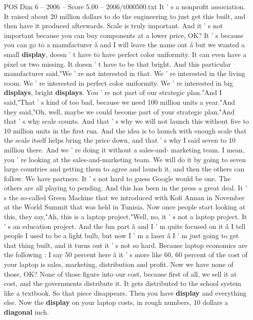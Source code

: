 \begin{textsample}{POS Dim 6 – 2006 – Score 5.00 – 2006/t000500.txt}
It ' s a nonprofit association.
It raised about 20 million dollars to do the engineering to just get this built, and then have it produced afterwards.
Scale is truly important.
And it ' s not important because you can buy components at a lower price, OK?
It ' s because you can go to a manufacturer â and I will leave the name out â but we wanted a small \textbf{display}, doesn ' t have to have perfect color uniformity.
It can even have a pixel or two missing.
It doesn ' t have to be that bright.
And this particular manufacturer said,"We ' re not interested in that.
We ' re interested in the living room.
We ' re interested in perfect color uniformity.
We ' re interested in big \textbf{displays}, bright \textbf{displays}.
You ' re not part of our strategic plan."And I said,"That ' s kind of too bad, because we need 100 million units a year."And they said,"Oh, well, maybe we could become part of your strategic plan."And that ' s why scale counts.
And that ' s why we will not launch this without five to 10 million units in the first run.
And the idea is to launch with enough scale that the scale itself helps bring the price down, and that ' s why I said seven to 10 million there.
And we ' re doing it without a sales-and- marketing team.
I mean, you ' re looking at the sales-and-marketing team.
We will do it by going to seven large countries and getting them to agree and launch it, and then the others can follow.
We have partners.
It ' s not hard to guess Google would be one.
The others are all playing to pending.
And this has been in the press a great deal.
It ' s the so-called Green Machine that we introduced with Kofi Annan in November at the World Summit that was held in Tunisia.
Now once people start looking at this, they say,"Ah, this is a laptop project."Well, no, it ' s not a laptop project.
It ' s an education project.
And the fun part â and I ' m quite focused on it â I tell people I used to be a light bulb, but now I ' m a laser â I ' m just going to get that thing built, and it turns out it ' s not so hard.
Because laptop economics are the following : I say 50 percent here â it ' s more like 60, 60 percent of the cost of your laptop is sales, marketing, distribution and profit.
Now we have none of those, OK?
None of those figure into our cost, because first of all, we sell it at cost, and the governments distribute it.
It gets distributed to the school system like a textbook.
So that piece disappears.
Then you have \textbf{display} and everything else.
Now the \textbf{display} on your laptop costs, in rough numbers, 10 dollars a \textbf{diagonal} inch.

\end{textsample}
